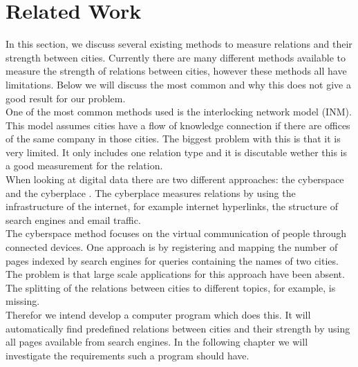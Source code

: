 \section{Related Work}
In this section, we discuss several existing methods to measure relations and their strength between cities. Currently there are many different methods available to measure the strength of relations between cities, however these methods all have limitations. Below we will discuss the most common and why this does not give a good result for our problem.\\

One of the most common methods used is the interlocking network model (INM)\cite{taylor2012interlocking}. This model assumes cities have a flow of knowledge connection if there are offices of the same company in those cities. The biggest problem with this is that it is very limited. It only includes one relation type and it is discutable wether this is a good measurement for the relation. \\

When looking at digital data there are two different approaches: the cyberspace and the cyberplace \cite{devriendt2008cyberplace}. The cyberplace measures relations by using the infrastructure of the internet, for example internet hyperlinks, the structure of search engines and email traffic.\\
The cyberspace method focuses on the virtual communication of people through connected devices. One approach is by registering and mapping the number of pages indexed by search engines for queries containing the names of two cities. The problem is that large scale applications for this approach have been absent. The splitting of the relations between cities to different topics, for example, is missing. \\

Therefor we intend develop a computer program which does this. It will automatically find predefined relations between cities and their strength by using all pages available from search engines. In the following chapter we will investigate the requirements such a program should have.